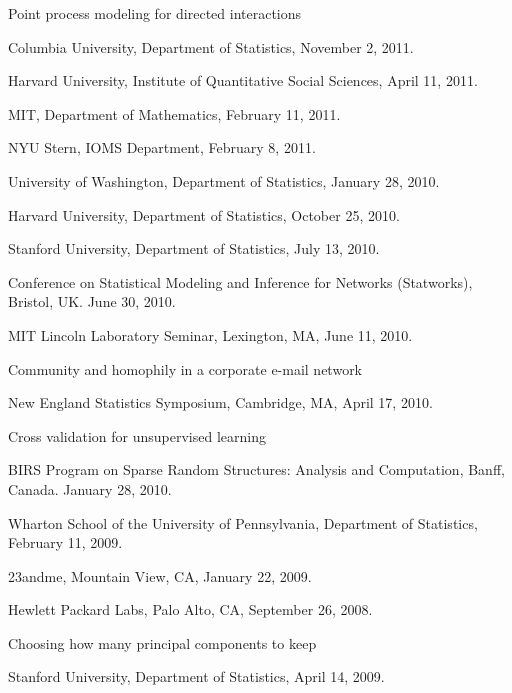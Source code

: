 \documentclass[10pt,letterpaper]{article}
\renewenvironment{itemize}{
  \begin{list}{}{
    \setlength{\leftmargin}{1.5em}
    \setlength{\itemsep}{0.25em}
    \setlength{\parskip}{0pt}
    \setlength{\parsep}{0.25em}
  }
}{
  \end{list}
}
\begin{document}
\begin{itemize}

\item Point process modeling for directed interactions
  \begin{itemize}
  \item Columbia University, Department of Statistics, November 2, 2011.
  \item Harvard University, Institute of Quantitative Social Sciences, April 11, 2011.
  \item MIT, Department of Mathematics, February 11, 2011.
  \item NYU Stern, IOMS Department, February 8, 2011.
  \item University of Washington, Department of Statistics, January 28, 2010.
  \item %
    Harvard University, Department of Statistics, October 25, 2010.
  \item %
    Stanford University, Department of Statistics, July 13, 2010.
  \item %
    Conference on Statistical Modeling and Inference for Networks (Statworks),
    Bristol, UK.  June 30, 2010.
  \item %
    MIT Lincoln Laboratory Seminar, Lexington, MA, June 11, 2010.
  \end{itemize}

\item Community and homophily in a corporate e-mail network
  \begin{itemize}
  \item New England Statistics Symposium, Cambridge, MA, April 17, 2010.
  \end{itemize}

\item Cross validation for unsupervised learning
  \begin{itemize}
    \item %
      BIRS Program on Sparse Random Structures: Analysis and Computation,
      Banff, Canada.
      January 28, 2010.
    \item Wharton School of the University of Pennsylvania, Department of Statistics,
      February 11, 2009. 
    \item 23andme, Mountain View, CA, January 22, 2009.
    \item Hewlett Packard Labs, Palo Alto, CA, September 26, 2008.
  \end{itemize}

\item Choosing how many principal components to keep
  \begin{itemize}
    \item Stanford University, Department of Statistics, April 14, 2009.
  \end{itemize}

\end{itemize}
\end{document}
